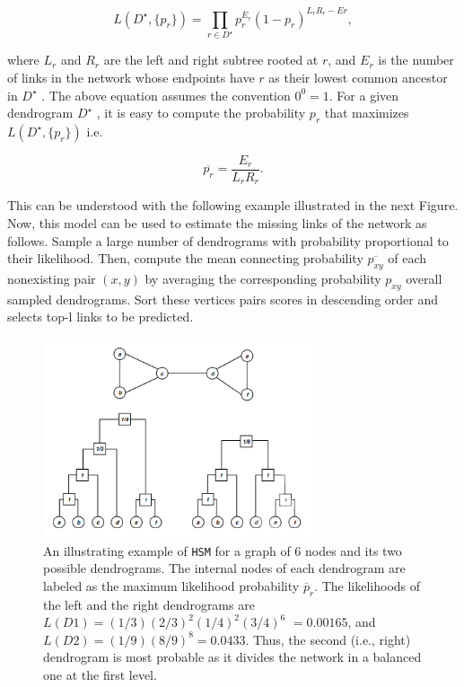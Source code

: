 \[
    L(D^{\star}, \{p_r\}) = \prod_{r \in D^{\star}} p_r^{E_r} (1-p_r)^{L_r R_r - Er},
\]

where \(L_r\) and \(R_r\) are the left and right subtree rooted at
\(r\), and \(E_r\) is the number of links in the network whose endpoints
have \(r\) as their lowest common ancestor in \(D^{\star}\) . The above
equation assumes the convention \(0^0 = 1\). For a given dendrogram
\(D^{\star}\) , it is easy to compute the probability \(p_r\) that
maximizes \(L(D^{\star}, \{p_r\})\) i.e.

\[
    \overline{p_r} = \frac{E_r}{L_r R_r}.
\]

This can be understood with the following example illustrated in the
next Figure. Now, this model can be used to estimate the missing links
of the network as follows. Sample a large number of dendrograms with
probability proportional to their likelihood. Then, compute the mean
connecting probability \(\overline{p_{xy}}\) of each nonexisting pair
\((x, y)\) by averaging the corresponding probability \(p_{xy}\) overall
sampled dendrograms. Sort these vertices pairs scores in descending
order and selects top-l links to be predicted.

\begin{figure}[H]
    \centering
    \includegraphics[width=8cm, keepaspectratio]{capitoli/methods/imgs/img8.png}
    \caption{ An illustrating example of \texttt{HSM} for a graph of 6 nodes and its
        two possible dendrograms. The internal nodes of each dendrogram are
        labeled as the maximum likelihood probability \(\overline{p}_r\). The
        likelihoods of the left and the right dendrograms are
        \(L(D1) = (1/3)(2/3)^2 (1/4)^2(3/4)^6\) \(= 0.00165\), and
        \(L(D2) = (1/9)(8/9)^8 = 0.0433\). Thus, the second (i.e., right)
        dendrogram is most probable as it divides the network in a balanced one
        at the first level.}
\end{figure}

